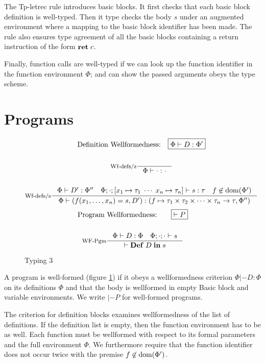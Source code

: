 \documentclass[a4paper, oneside, 10pt, final]{memoir}
\begin{document}
The Tp-letrec rule introduces basic blocks. It first checks that each
basic block definition is well-typed. Then it type checks the body $s$
under an augmented environment where a mapping to the basic block
identifier has been made. The rule also ensures type agreement of all the basic
blocks containing a return instruction of the form $\mathbf{ret} \; c$.

Finally, function calls are well-typed if we can look up the function
identifier in the function environment $\Phi$; and can show the
passed arguments obeys the type scheme.

\section{Programs}
\begin{figure}
  \begin{gather*}
    \text{Definition Wellformedness:} \quad \boxed{\Phi |- D : \Phi'}\\\\
    \inference[Wf-defs/z]{}{\Phi |- \cdot : \cdot}\\\\
    \inference[Wf-defs/s]{\Phi |- D' : \Phi'' \quad \Phi;\cdot;[x_1 \mapsto
      \tau_1 \; \dotsb \; x_n \mapsto \tau_n] |- s :
      \tau \quad f \not \in \dom{\Phi'}}{\Phi |- (f(x_1, \dotsc, x_n) = s, D') : (f \mapsto \ntypes -> \tau, \Phi'')}
  \end{gather*}
  \begin{gather*}
    \text{Program Wellformedness:} \quad \quad \boxed{|- P}\\\\
    \inference[WF-Pgm]{\Phi |- D : \Phi \quad \Phi;\cdot;\cdot |- s}{|- \ipgm{D}{s}}
  \end{gather*}
  \caption{Typing 3}
  \label{fig:type-judgement-3}
\end{figure}

A program is well-formed (figure \ref{fig:type-judgement-3}) if it
obeys a wellformedness criterion $\boxed{\Phi |- D : \Phi}$ on its
definitions $\Phi$ and that the body is wellformed in empty Basic
block and variable environments. We write $\boxed{|- P}$ for
well-formed programs.

The criterion for definition blocks examines wellformedness of the
list of definitions. If the definition list is empty, then the
function environment has to be as well. Each function must be
wellformed with respect to its formal parameters and the full
environment $\Phi$. We furthermore require that the function identifier
does not occur twice with the premise $f \not \in \mathrm{dom}(\Phi')$.
\end{document}
